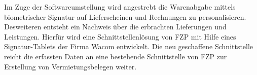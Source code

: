 Im Zuge der Softwareumstellung wird angestrebt die Warenabgabe mittels biometrischer Signatur auf Lieferscheinen und Rechnungen zu personalisieren. Desweiteren entsteht ein Nachweis über die erbrachten Lieferungen und Leistungen. Hierfür wird eine Schnittstellenlösung von FZP mit Hilfe eines Signatur-Tablets der Firma Wacom entwickelt. Die neu geschaffene Schnittstelle reicht die erfassten Daten an eine bestehende Schnittstelle von FZP zur Erstellung von Vermietungsbelegen weiter. \cite{einleitung1}